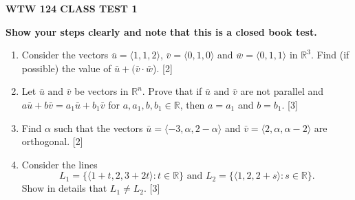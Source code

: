 \documentclass[11pt]{article}
\begin{document}
\begin{center}
    \textbf{\huge WTW 124 \quad CLASS TEST 1}
\end{center}

\textbf{Show your steps clearly and note that this is a closed book test.}

\begin{enumerate}
    \item Consider the vectors \(\bar{u} = \langle1,1,2\rangle\), \(\bar{v} = \langle 0,1,0\rangle\) and \(\bar{w} = \langle0,1,1\rangle \) in \(\mathbb{R}^3\).
    Find (if possible) the value of \(\bar{u} + (\bar{v} \cdot \bar{w}\)). \hfill [2]

    \vspace{8cm}

    \item Let \(\bar{u} \text{ and } \bar{v}\) be vectors in \(\mathbb{R}^n\). Prove that if \(\bar{u} \text{ and } \bar{v}\) are not parallel and \(a\bar{u}+b\bar{v} = a_1\bar{u}+b_1\bar{v}\)
    for \(a,a_1,b,b_1 \in \mathbb{R}\), then \(a = a_1\) and \(b = b_1\). \hfill [3]

    \newpage

    \item Find \(\alpha\) such that the vectors \(\bar{u} = \langle-3,\alpha , 2-\alpha\rangle\) and \(\bar{v} = \langle2,\alpha , \alpha-2\rangle\) are orthogonal. \hfill [2]
    
    \vspace{8cm}

    \item Consider the lines \[L_1 = \{\langle1+t,2,3+2t\rangle:t \in \mathbb{R}\} \text{ and } L_2 = \{\langle1,2,2+s\rangle:s\in\mathbb{R}\}.\]
    Show in details that \(L_1 \neq L_2\). \hfill [3]
\end{enumerate}
\end{document}
